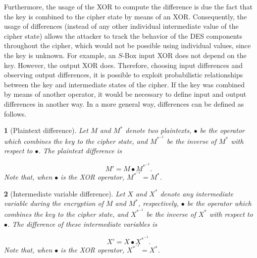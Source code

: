\documentclass{report}
\newtheorem*{concept}{}{\bfseries}{\itshape}
\begin{document}
Furthermore, the usage of the XOR to compute the difference is due the fact that the key is combined to the cipher state by means of an XOR. Consequently, the usage of differences (instead of any other individual intermediate value of the cipher state) allows the attacker to track the behavior of the DES components throughout the cipher, which would not be possible using individual values, since the key is unknown. For example, an $S$-Box input XOR does not depend on the key. However, the output XOR does. Therefore, choosing input differences and observing output differences, it is possible to exploit probabilistic relationships between the key and intermediate states of the cipher. If the key was combined by means of another operator, it would be necessary to define input and output differences in another way. In a more general way, differences can be defined as follows.

\begin{concept}[Plaintext difference]
Let $M$ and $M^*$ denote two plaintexts, $\bullet$ be the operator which combines the key to the cipher state, and $M^{*^{-1}}$ be the inverse of $M^*$ with respect to $\bullet$. The plaintext difference is 

$$
M' = M \bullet M^{*^{-1}}.
$$
Note that, when $\bullet$ is the XOR operator, $M^{*^{-1}} = M^*$.
\end{concept}

\begin{concept}[Intermediate variable difference]
Let $X$ and $X^*$ denote any intermediate variable during the encryption of $M$ and $M^*$, respectively, $\bullet$ be the operator which combines the key to the cipher state, and $X^{*^{-1}}$ be the inverse of $X^*$ with respect to $\bullet$. The difference of these intermediate variables is 

$$
X' = X \bullet X^{*^{-1}}.
$$
Note that, when $\bullet$ is the XOR operator, $X^{*^{-1}} = X^*$.
\end{concept}
\end{document}
